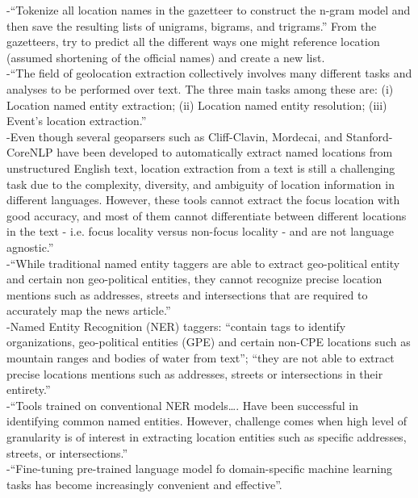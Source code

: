 -{\color{orange}“Tokenize all location names in the gazetteer to construct the n-gram model and then save the resulting lists of unigrams, bigrams, and trigrams.” From the gazetteers, try to predict all the different ways one might reference location (assumed shortening of the official names) and create a new list.\cite{Al-Olimat2018}}\\
-{\color{orange}“The field of geolocation extraction collectively involves many different tasks and analyses to be performed over text. The three main tasks among these are: (i) Location named entity extraction; (ii) Location named entity resolution; (iii) Event’s location extraction.”\cite{Imani2019}}\\
-{\color{orange}Even though several geoparsers such as Cliff-Clavin, Mordecai, and Stanford-CoreNLP have been developed to automatically extract named locations from unstructured English text, location extraction from a text is still a challenging task due to the complexity, diversity, and ambiguity of location information in different languages. However, these tools cannot extract the focus location with good accuracy, and most of them cannot differentiate between different locations in the text - i.e. focus locality versus non-focus locality - and are not language agnostic.”\cite{Imani2019}}\\
-{\color{orange}“While traditional named entity taggers are able to extract geo-political entity and certain non geo-political entities, they cannot recognize precise location mentions such as addresses, streets and intersections that are required to accurately map the news article.”\cite{Gupta2020}}\\
-{\color{orange}Named Entity Recognition (NER) taggers: “contain tags to identify organizations, geo-political entities (GPE) and certain non-CPE locations such as mountain ranges and bodies of water from text”; “they are not able to extract precise locations mentions such as addresses, streets or intersections in their entirety.”\cite{Gupta2020}}\\
-{\color{orange}“Tools trained on conventional NER models…. Have been successful in identifying common named entities. However, challenge comes when high level of granularity is of interest in extracting location entities such as specific addresses, streets, or intersections.”\cite{Gupta2020}}\\
-{\color{orange}“Fine-tuning pre-trained language model fo domain-specific machine learning tasks has become increasingly convenient and effective”.\cite{Gupta2020}}\\
